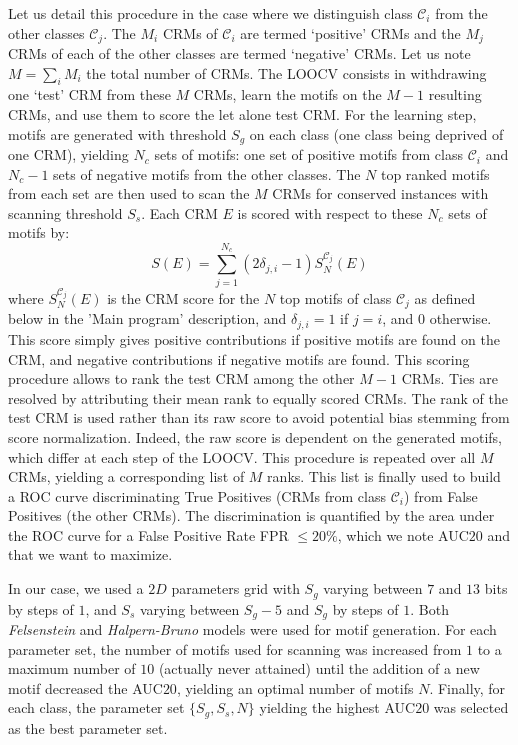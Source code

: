 \documentclass[a4,center,fleqn]{NAR}
\begin{document}
Let us detail this procedure in the case where we distinguish class
$\mathcal{C}_i$ from the other classes $\mathcal{C}_j$.
The $M_i$ CRMs of $\mathcal{C}_i$ are termed `positive' CRMs and the $M_j$ CRMs
of each of the other classes are termed `negative' CRMs.
Let us note $M=\sum_i M_i$ the total number of CRMs.
The LOOCV consists in withdrawing one `test' CRM from these $M$ CRMs, learn the
motifs on the $M-1$ resulting CRMs, and use them to score the let alone test
CRM.
For the learning step, motifs are generated with threshold $S_g$ on each class
(one class being deprived of one CRM), yielding $N_c$ sets of motifs: one set
of positive motifs from class $\mathcal{C}_i$ and $N_c-1$ sets of negative
motifs from the other classes.
The $N$ top ranked motifs from each set are then used to scan the $M$ CRMs for
conserved instances with scanning threshold $S_s$.
Each CRM $E$ is scored with respect to these $N_c$ sets of motifs by:
\begin{equation}
    S(E) = \sum_{j=1}^{N_c} (2\delta_{j,i} - 1) S_N^{\mathcal{C}_j}(E) 
    \label{score_enh}
\end{equation}
where $ S_N^{\mathcal{C}_j}(E)$ is the CRM score for the $N$ top motifs of
class $\mathcal{C}_j$ as defined below in the 'Main program' description, and
$\delta_{j,i}=1$ if $j=i$, and $0$ otherwise.
This score simply gives positive contributions if positive motifs are found on
the CRM, and negative contributions if negative motifs are found.
This scoring procedure allows to rank the test CRM among the other $M-1$ CRMs.
Ties are resolved by attributing their mean rank to equally scored CRMs.
The rank of the test CRM is used rather than its raw score to avoid potential
bias stemming from score normalization.
Indeed, the raw score is dependent on the generated motifs, which differ at
each step of the LOOCV.
This procedure is repeated over all $M$ CRMs, yielding a corresponding list of
$M$ ranks.
This list is finally used to build a ROC curve discriminating True Positives
(CRMs from class $\mathcal{C}_i$) from False Positives (the other CRMs).
The discrimination is quantified by the area under the ROC curve for a False
Positive Rate FPR $ \leq 20\%$, which we note AUC$20$ and that we want to
maximize.

In our case, we used a $2D$ parameters grid with $S_g$ varying between $7$ and
$13$ bits by steps of $1$, and $S_s$ varying between $S_g-5$ and $S_g$ by steps
of $1$.
Both {\em Felsenstein} and {\em Halpern-Bruno} models were used for motif
generation. 
For each parameter set, the number of motifs used for scanning was increased
from $1$ to a maximum number of $10$ (actually never attained) until the
addition of a new motif decreased the AUC$20$, yielding an optimal number of
motifs $N$.
Finally, for each class, the parameter set $\{S_g, S_s, N\}$ yielding the
highest AUC$20$ was selected as the best parameter set.
\end{document}
